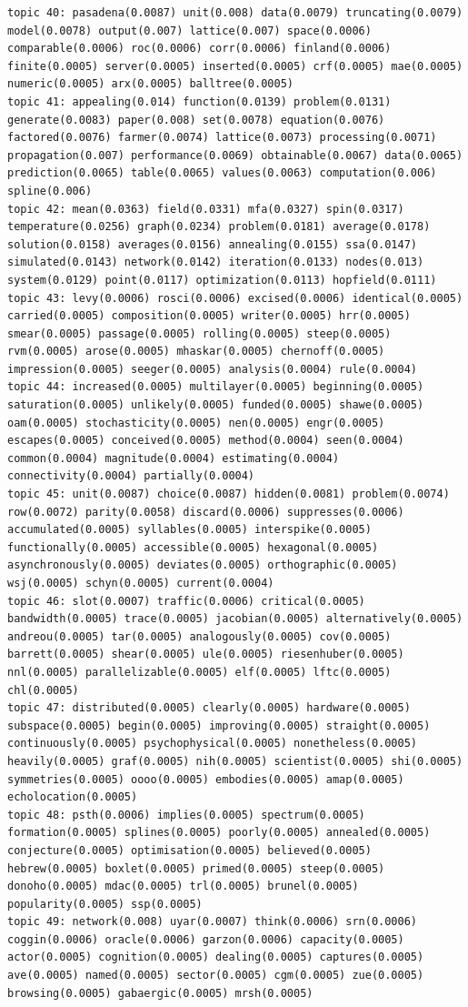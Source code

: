 \documentclass[10pt]{article}
\begin{document}
\begin{verbatim}
topic 40: pasadena(0.0087) unit(0.008) data(0.0079) truncating(0.0079) model(0.0078) output(0.007) lattice(0.007) space(0.0006) comparable(0.0006) roc(0.0006) corr(0.0006) finland(0.0006) finite(0.0005) server(0.0005) inserted(0.0005) crf(0.0005) mae(0.0005) numeric(0.0005) arx(0.0005) balltree(0.0005)
topic 41: appealing(0.014) function(0.0139) problem(0.0131) generate(0.0083) paper(0.008) set(0.0078) equation(0.0076) factored(0.0076) farmer(0.0074) lattice(0.0073) processing(0.0071) propagation(0.007) performance(0.0069) obtainable(0.0067) data(0.0065) prediction(0.0065) table(0.0065) values(0.0063) computation(0.006) spline(0.006)
topic 42: mean(0.0363) field(0.0331) mfa(0.0327) spin(0.0317) temperature(0.0256) graph(0.0234) problem(0.0181) average(0.0178) solution(0.0158) averages(0.0156) annealing(0.0155) ssa(0.0147) simulated(0.0143) network(0.0142) iteration(0.0133) nodes(0.013) system(0.0129) point(0.0117) optimization(0.0113) hopfield(0.0111)
topic 43: levy(0.0006) rosci(0.0006) excised(0.0006) identical(0.0005) carried(0.0005) composition(0.0005) writer(0.0005) hrr(0.0005) smear(0.0005) passage(0.0005) rolling(0.0005) steep(0.0005) rvm(0.0005) arose(0.0005) mhaskar(0.0005) chernoff(0.0005) impression(0.0005) seeger(0.0005) analysis(0.0004) rule(0.0004)
topic 44: increased(0.0005) multilayer(0.0005) beginning(0.0005) saturation(0.0005) unlikely(0.0005) funded(0.0005) shawe(0.0005) oam(0.0005) stochasticity(0.0005) nen(0.0005) engr(0.0005) escapes(0.0005) conceived(0.0005) method(0.0004) seen(0.0004) common(0.0004) magnitude(0.0004) estimating(0.0004) connectivity(0.0004) partially(0.0004)
topic 45: unit(0.0087) choice(0.0087) hidden(0.0081) problem(0.0074) row(0.0072) parity(0.0058) discard(0.0006) suppresses(0.0006) accumulated(0.0005) syllables(0.0005) interspike(0.0005) functionally(0.0005) accessible(0.0005) hexagonal(0.0005) asynchronously(0.0005) deviates(0.0005) orthographic(0.0005) wsj(0.0005) schyn(0.0005) current(0.0004)
topic 46: slot(0.0007) traffic(0.0006) critical(0.0005) bandwidth(0.0005) trace(0.0005) jacobian(0.0005) alternatively(0.0005) andreou(0.0005) tar(0.0005) analogously(0.0005) cov(0.0005) barrett(0.0005) shear(0.0005) ule(0.0005) riesenhuber(0.0005) nnl(0.0005) parallelizable(0.0005) elf(0.0005) lftc(0.0005) chl(0.0005)
topic 47: distributed(0.0005) clearly(0.0005) hardware(0.0005) subspace(0.0005) begin(0.0005) improving(0.0005) straight(0.0005) continuously(0.0005) psychophysical(0.0005) nonetheless(0.0005) heavily(0.0005) graf(0.0005) nih(0.0005) scientist(0.0005) shi(0.0005) symmetries(0.0005) oooo(0.0005) embodies(0.0005) amap(0.0005) echolocation(0.0005)
topic 48: psth(0.0006) implies(0.0005) spectrum(0.0005) formation(0.0005) splines(0.0005) poorly(0.0005) annealed(0.0005) conjecture(0.0005) optimisation(0.0005) believed(0.0005) hebrew(0.0005) boxlet(0.0005) primed(0.0005) steep(0.0005) donoho(0.0005) mdac(0.0005) trl(0.0005) brunel(0.0005) popularity(0.0005) ssp(0.0005)
topic 49: network(0.008) uyar(0.0007) think(0.0006) srn(0.0006) coggin(0.0006) oracle(0.0006) garzon(0.0006) capacity(0.0005) actor(0.0005) cognition(0.0005) dealing(0.0005) captures(0.0005) ave(0.0005) named(0.0005) sector(0.0005) cgm(0.0005) zue(0.0005) browsing(0.0005) gabaergic(0.0005) mrsh(0.0005)


\end{verbatim}
\end{document}
